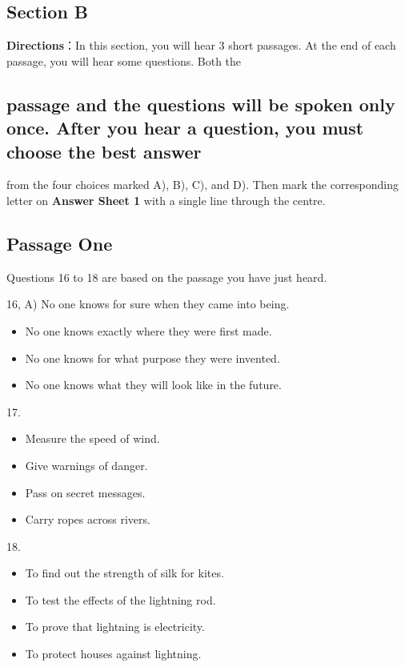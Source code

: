 \documentclass[UTF8,11pt]{ctexart}
\begin{document}
\subsection*{\textbf{Section B}}


\textbf{Directions}：In this section, you will hear 3 short passages. At the end of each passage, you will hear some questions. Both the


\subsection*{passage and the questions will be spoken only once. After you hear a question, you must choose the best answer}


from the four choices marked A), B), C), and D). Then mark the corresponding letter on\textbf{ Answer Sheet 1} with a single line through the centre.


\subsection*{Passage One}


Questions 16 to 18 are based on the passage you have just heard.


16, A) No one knows for sure when they came into being.


\begin{itemize}[leftmargin=2em,itemsep=.2em,topsep=.4em]\item[B.] No one knows exactly where they were first made.
\item[C.] No one knows for what purpose they were invented.
\item[D.] No one knows what they will look like in the future.
\end{itemize}

17.


\begin{itemize}[leftmargin=2em,itemsep=.2em,topsep=.4em]\item[A.] Measure the speed of wind.
\item[B.] Give warnings of danger.
\item[C.] Pass on secret messages.
\item[D.] Carry ropes across rivers.
\end{itemize}

18.


\begin{itemize}[leftmargin=2em,itemsep=.2em,topsep=.4em]\item[A.] To find out the strength of silk for kites.
\item[B.] To test the effects of the lightning rod.
\item[C.] To prove that lightning is electricity.
\item[D.] To protect houses against lightning.
\end{itemize}
\end{document}
